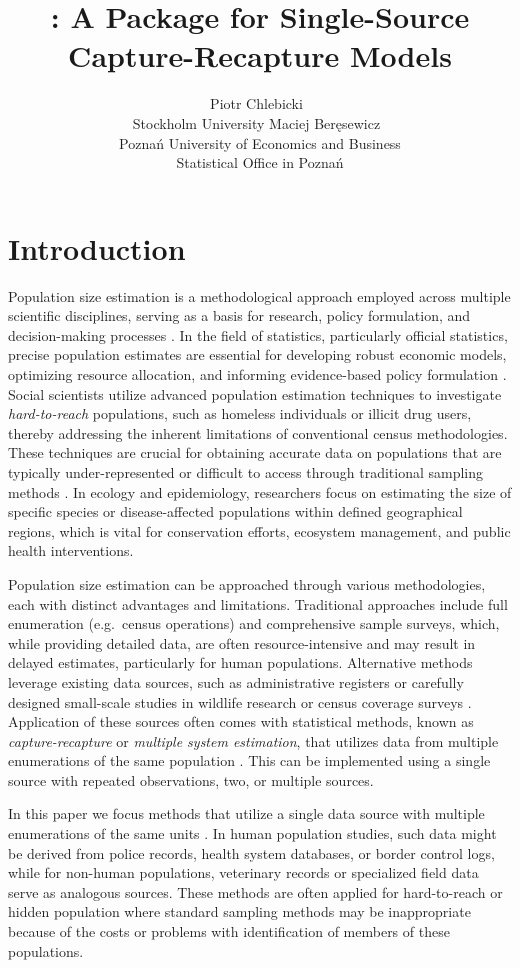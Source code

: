 \documentclass[
]{jss}
\author{
Piotr Chlebicki~\orcidlink{0009-0006-4867-7434}\\Stockholm
University \And Maciej
Beręsewicz~\orcidlink{0000-0002-8281-4301}\\Poznań University of
Economics and Business\\
Statistical Office in Poznań
}
\title{\pkg{singleRcapture}: A Package for Single-Source
Capture-Recapture Models}
\newcommand{\1}{\mathcal{I}} \newcommand{\bZero}{\boldsymbol{0}}
\begin{document}
\section{Introduction}\label{sec-introduction}

Population size estimation is a methodological approach employed across
multiple scientific disciplines, serving as a basis for research, policy
formulation, and decision-making processes \citep{bohning2018capture}.
In the field of statistics, particularly official statistics, precise
population estimates are essential for developing robust economic
models, optimizing resource allocation, and informing evidence-based
policy formulation \citep[cf.][]{baffour-awuah2009}. Social scientists
utilize advanced population estimation techniques to investigate
\emph{hard-to-reach} populations, such as homeless individuals or
illicit drug users, thereby addressing the inherent limitations of
conventional census methodologies. These techniques are crucial for
obtaining accurate data on populations that are typically
under-represented or difficult to access through traditional sampling
methods \citep{vincent2022estimating}. In ecology and epidemiology,
researchers focus on estimating the size of specific species or
disease-affected populations within defined geographical regions, which
is vital for conservation efforts, ecosystem management, and public
health interventions.

Population size estimation can be approached through various
methodologies, each with distinct advantages and limitations.
Traditional approaches include full enumeration (e.g.~census operations)
and comprehensive sample surveys, which, while providing detailed data,
are often resource-intensive and may result in delayed estimates,
particularly for human populations. Alternative methods leverage
existing data sources, such as administrative registers or carefully
designed small-scale studies in wildlife research or census coverage
surveys \citep{wolter1986some, zhang2019note}. Application of these
sources often comes with statistical methods, known as
\emph{capture-recapture} or \emph{multiple system estimation}, that
utilizes data from multiple enumerations of the same population
\citep[cf.][]{dunne2024system}. This can be implemented using a single
source with repeated observations, two, or multiple sources.

In this paper we focus methods that utilize a single data source with
multiple enumerations of the same units \citep[cf.][]{ztpoisson}. In
human population studies, such data might be derived from police
records, health system databases, or border control logs, while for
non-human populations, veterinary records or specialized field data
serve as analogous sources. These methods are often applied for
hard-to-reach or hidden population where standard sampling methods may
be inappropriate because of the costs or problems with identification of
members of these populations.
\end{document}
